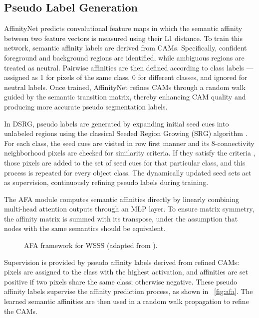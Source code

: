 \subsection{Pseudo Label Generation}
\label{subsec:pseudo-label-generation}
AffinityNet\cite{wsss_affinitynet} predicts convolutional feature maps in which the semantic affinity between two feature vectors is measured using their L1 distance. To train this network, semantic affinity labels are derived from CAMs. Specifically, confident foreground and background regions are identified, while ambiguous regions are treated as neutral. Pairwise affinities are then defined according to class labels — assigned as 1 for pixels of the same class, 0 for different classes, and ignored for neutral labels. Once trained, AffinityNet refines CAMs through a random walk guided by the semantic transition matrix, thereby enhancing CAM quality and producing more accurate pseudo segmentation labels.

In DSRG\cite{wsss_dsrg_deep_seeded_region_growing}, pseudo labels are generated by expanding initial seed cues into unlabeled regions using the classical Seeded Region Growing (SRG) algorithm \cite{srg}. For each class, the seed cues are visited in row first manner and its 8-connectivity neighborhood pixels are checked for similarity criteria. If they satisfy the criteria , those pixels are added to the set of seed cues for that particular class, and this process is repeated for every object class. The dynamically updated seed sets act as supervision, continuously refining pseudo labels during training.

The AFA\cite{wsss_afa_affinity_from_attention} module computes semantic affinities directly by linearly combining multi-head attention outputs through an MLP layer. To ensure matrix symmetry, the affinity matrix is summed with its transpose, under the assumption that nodes with the same semantics should be equivalent. 
\begin{figure}[htbp]
    \centering
    \caption{AFA framework for WSSS (adapted from \cite{wsss_afa_affinity_from_attention}).}
    \label{fig:afa}
\end{figure}
Supervision is provided by pseudo affinity labels derived from refined CAMs: pixels are assigned to the class with the highest activation, and affinities are set positive if two pixels share the same class; otherwise negative. These pseudo affinity labels supervise the affinity prediction process, as shown in ~\autoref{fig:afa}. The learned semantic affinities are then used in a random walk propagation to refine the CAMs.

